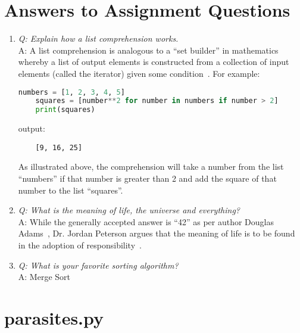 \documentclass[journal,onecolumn]{IEEEtran}
\begin{document}
\section{Answers to Assignment Questions}
\begin{enumerate}
	\item \emph{Q: Explain how a list comprehension works.} \\
	A: A list comprehension is analogous to a ``set builder'' in mathematics 
	whereby a list of output elements is constructed from a collection of input 
	elements (called the iterator) given some condition~\cite{yordanov:2019}. 
	For example: 

	\begin{lstlisting}[language=Python]
	numbers = [1, 2, 3, 4, 5]
	squares = [number**2 for number in numbers if number > 2]
	print(squares)
	\end{lstlisting}

	output:
 
	\begin{lstlisting}
	[9, 16, 25]
	\end{lstlisting}

	As illustrated above, the comprehension will take a number from the list ``numbers'' if that
	number is greater than 2 and add the square of that number to the list ``squares''. \\

    \item \emph{Q: What is the meaning of life, the universe and everything?} \\
    A: While the generally accepted answer is ``42'' as per author Douglas Adams~\cite{adams:1980}, Dr. Jordan Peterson argues that the meaning of life is to be found in the adoption of responsibility~\cite{lott:2019}. \\

    \item \emph{Q: What is your favorite sorting algorithm?} \\
    A: Merge Sort 

\end{enumerate}	

\newpage

\section{parasites.py}
\label{app1}
\lstset{basicstyle=\small\selectfont\ttfamily}

\end{document}
